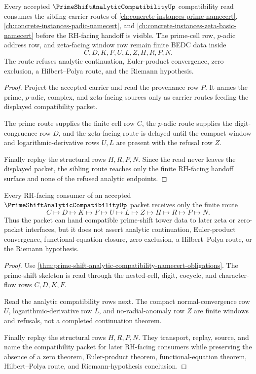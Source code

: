 \begin{theorem}
\label{thm:prime-shift-analytic-compatibility-sibling-route}
Every accepted $\PrimeShiftAnalyticCompatibilityUp$ compatibility read consumes the sibling carrier routes of \autoref{ch:concrete-instances-prime-namecert}, \autoref{ch:concrete-instances-padic-namecert}, and \autoref{ch:concrete-instances-zeta-basic-namecert} before the RH-facing handoff is visible. The prime-cell row, $p$-adic address row, and zeta-facing window row remain finite BEDC data inside
$$
C,D,K,F,U,L,Z,H,R,P,N .
$$
The route refuses analytic continuation, Euler-product convergence, zero exclusion, a Hilbert--Polya route, and the Riemann hypothesis.
\end{theorem}
\begin{proof}
Project the accepted carrier and read the provenance row $P$. It names the prime, $p$-adic, complex, and zeta-facing sources only as carrier routes feeding the displayed compatibility packet.

The prime route supplies the finite cell row $C$, the $p$-adic route supplies the digit-congruence row $D$, and the zeta-facing route is delayed until the compact window and logarithmic-derivative rows $U,L$ are present with the refusal row $Z$.

Finally replay the structural rows $H,R,P,N$. Since the read never leaves the displayed packet, the sibling route reaches only the finite RH-facing handoff surface and none of the refused analytic endpoints.
\end{proof}

\begin{theorem}
\label{thm:prime-shift-analytic-compatibility-rh-handoff}
Every RH-facing consumer of an accepted $\PrimeShiftAnalyticCompatibilityUp$ packet receives only the finite route
$$
C\longmapsto D\longmapsto K\longmapsto F\longmapsto U\longmapsto L\longmapsto Z\longmapsto H\longmapsto R\longmapsto P\longmapsto N .
$$
Thus the packet can hand compatible prime-shift tower data to later zeta or zero-packet interfaces, but it does not assert analytic continuation, Euler-product convergence, functional-equation closure, zero exclusion, a Hilbert--Polya route, or the Riemann hypothesis.
\end{theorem}
\begin{proof}
Use \autoref{thm:prime-shift-analytic-compatibility-namecert-obligations}. The prime-shift skeleton is read through the nested-cell, digit, cocycle, and character-flow rows $C,D,K,F$.

Read the analytic compatibility rows next. The compact normal-convergence row $U$, logarithmic-derivative row $L$, and no-radial-anomaly row $Z$ are finite windows and refusals, not a completed continuation theorem.

Finally replay the structural rows $H,R,P,N$. They transport, replay, source, and name the compatibility packet for later RH-facing consumers while preserving the absence of a zero theorem, Euler-product theorem, functional-equation theorem, Hilbert--Polya route, and Riemann-hypothesis conclusion.
\end{proof}

